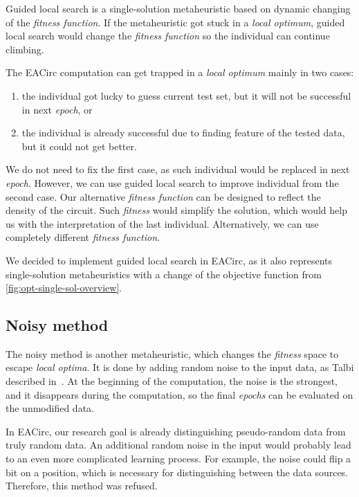 \documentclass[
    digital,    %
    oneside,    %
    color,
    11pt,
    nocover,
    notable,
    nolof,
    nolot,
]{fithesis3}
\begin{document}
Guided local search is a single-solution metaheuristic based on dynamic changing of the \textit{fitness function}. If the metaheuristic got stuck in a \textit{local optimum}, guided local search would change the \textit{fitness function} so the individual can continue climbing.

The EACirc computation can get trapped in a \textit{local optimum} mainly in two cases:

\begin{enumerate}[noitemsep,topsep=3pt,parsep=3pt,partopsep=3pt]
    \item the individual got lucky to guess current test set, but it will not be successful in next \textit{epoch}, or
    \item the individual is already successful due to finding feature of the tested data, but it could not get better.
\end{enumerate}

We do not need to fix the first case, as such individual would be replaced in next \textit{epoch}. However, we can use guided local search to improve individual from the second case. Our alternative \textit{fitness function} can be designed to reflect the density of the circuit. Such \textit{fitness} would simplify the solution, which would help us with the interpretation of the last individual. Alternatively, we can use completely different \textit{fitness function}.

We decided to implement guided local search in EACirc, as it also represents single-solution metaheuristics with a change of the objective function from \cref{fig:opt-single-sol-overview}.

\subsection{Noisy method}
\label{subsec:opt-single-sol-nois}

The noisy method is another metaheuristic, which changes the \textit{fitness} space to escape \textit{local optima}. It is done by adding random noise to the input data, as Talbi described in~\cite[Section 2.9.2]{talbi2009metaheuristics}. At the beginning of the computation, the noise is the strongest, and it disappears during the computation, so the final \textit{epochs} can be evaluated on the unmodified data.

In EACirc, our research goal is already distinguishing pseudo-random data from truly random data. An additional random noise in the input would probably lead to an even more complicated learning process. For example, the noise could flip a bit on a position, which is necessary for distinguishing between the data sources. Therefore, this method was refused.
\end{document}
